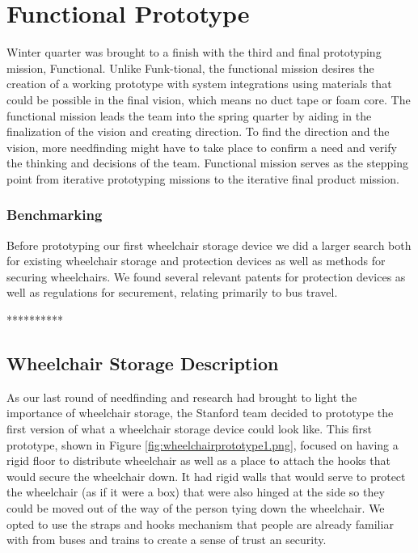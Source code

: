 \section{Functional Prototype}
Winter quarter was brought to a finish with the third and final prototyping mission, Functional.  Unlike Funk-tional, the functional mission desires the creation of a working prototype with system integrations using materials that could be possible in the final vision, which means no duct tape or foam core. The functional mission leads the team into the spring quarter by aiding in the finalization of the vision and creating direction.  To find the direction and the vision, more needfinding might have to take place to confirm a need and verify the thinking and decisions of the team. Functional mission serves as the stepping point from iterative prototyping missions to the iterative final product mission.

\subsubsection{Benchmarking}
Before prototyping our first wheelchair storage device we did a larger search both for existing wheelchair storage and protection devices as well as methods for securing wheelchairs. We found several relevant patents for protection devices as well as regulations for securement, relating primarily to bus travel.

**********


\subsection{Wheelchair Storage Description}

As our last round of needfinding and research had brought to light the importance of wheelchair storage, the Stanford team decided to prototype the first version of what a wheelchair storage device could look like. This first prototype, shown in 
Figure \ref{fig:wheelchairprototype1.png}, focused on having a rigid floor to distribute wheelchair as well as a place to attach the hooks that would secure the wheelchair down. It had rigid walls that would serve to protect the wheelchair (as if it were a box) that were also hinged at the side so they could be moved out of the way of the person tying down the wheelchair. We opted to use the straps and hooks mechanism that people are already familiar with from buses and trains to create a sense of trust an security. 

